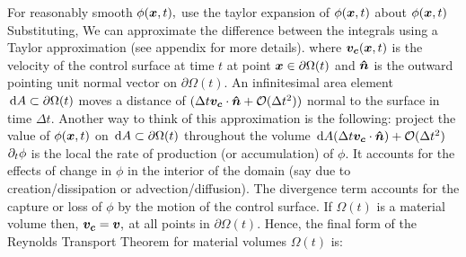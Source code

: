 For reasonably smooth  $\phi(\boldsymbol{x},t),$ use the taylor expansion of $\phi(\boldsymbol{x},t)$ about $\phi(\boldsymbol{x},t)$
Substituting,
We can approximate the difference between the integrals using a Taylor approximation (see appendix for more details).
where $\boldsymbol{v_c}(\boldsymbol{x},t)$ is the velocity of the control surface at time $t$ at point $\boldsymbol{x}\in\partial\Omega(t)$ and $\boldsymbol{\hat{n}}$ is the outward pointing unit normal vector on $\partial\Omega(t)$. An infinitesimal area element $\,\mathrm{d} A\subset\partial\Omega(t)$ moves a distance of $(\Delta t\boldsymbol{v_c}\cdot\boldsymbol{\hat{n}}+\mathcal{O}(\Delta t^2))$ normal to the surface in time $\Delta t.$ Another way to think of this approximation is the following: project the value of $\phi(\boldsymbol{x},t)$ on $\,\mathrm{d} A\subset\partial\Omega(t)$ throughout the volume $\,\mathrm{d} A(\Delta t\boldsymbol{v_c}\cdot\boldsymbol{\hat{n}})+\mathcal{O}(\Delta t^2)$
$\partial_{t}\phi$ is the local the rate of production (or accumulation) of $\phi.$ It accounts for the effects of change in $\phi$ in the interior of the domain (say due to creation/dissipation or advection/diffusion). The divergence term accounts for the capture or loss of $\phi$ by the motion of the control surface. If $\Omega(t)$ is a material volume then, $\boldsymbol{v_c}=\boldsymbol{v},$ at all points in $\partial\Omega(t)$. Hence, the final form of the Reynolds Transport Theorem for material volumes $\Omega(t)$ is:

